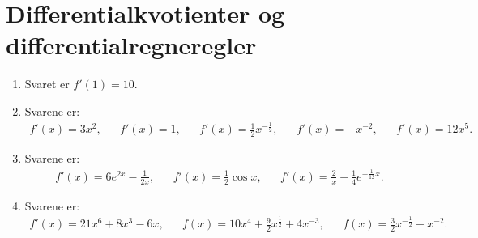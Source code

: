 \section{Differentialkvotienter og differentialregneregler}
\begin{enumerate}
	\item Svaret er $f'(1)=10$.

	\item Svarene er:
	\begin{align*}
	f'(x)=3x^2,&& f'(x)=1,&& f'(x)=\frac{1}{2}x^{-\frac{1}{2}},&& f'(x)=-x^{-2},&& f'(x)=12x^5.
	\end{align*}
	
	\item Svarene er: 
	\begin{align*}
	f'(x)=6e^{2x}-\frac{1}{2x},&& f'(x)=\frac{1}{2}\cos x,&& f'(x)=\frac{2}{x}-\frac{1}{4}e^{-\frac{1}{12}x}.
	\end{align*}
	
	\item Svarene er:
	\begin{align*}
	f'(x)=21x^6+8x^3-6x,&&f(x)=10x^4+\frac{9}{2}x^{\frac{1}{2}}+4x^{-3},&&f(x)=\frac{3}{2}x^{-\frac{1}{2}}-x^{-2}.
	\end{align*}
	

\end{enumerate}

